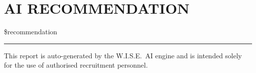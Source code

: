 \documentclass[11pt]{article}
\begin{document}
\vspace{0.4cm}

\section{AI RECOMMENDATION}

\begin{mdframed}[
  linecolor=WiseBorder,
  linewidth=0.6pt,
  backgroundcolor=WiseLightGray,
  innerleftmargin=10pt,
  innerrightmargin=10pt,
  innertopmargin=8pt,
  innerbottommargin=8pt,
  skipabove=0pt,
  skipbelow=0pt
]
\textcolor{WiseGray}{\${recommendation}}
\end{mdframed}

\vspace{0.5cm}
\textcolor{WiseBorder}{\rule{\textwidth}{0.8pt}}

\begin{center}
  \footnotesize\textcolor{WiseGray}{%
    This report is auto-generated by the W.I.S.E.\ AI engine and is
    intended solely for the use of authorised recruitment personnel.%
  }
\end{center}
\end{document}
